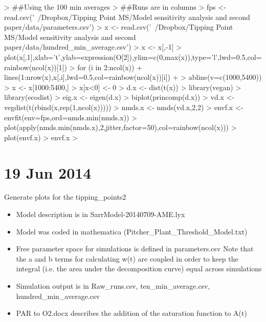 \documentclass[12pt]{article}
\begin{document}
\begin{Schunk}
\begin{Sinput}
> ##Using the 100 min averages
> ##Runs are in columns
>   fps <- read.csv('~/Dropbox/Tipping Point MS/Model sensitivity analysis and second paper/data/parameters.csv') 
> x <- read.csv('~/Dropbox/Tipping Point MS/Model sensitivity analysis and second paper/data/hundred_min_average.csv')
> x <- x[,-1]
> plot(x[,1],xlab='t',ylab=expression(O[2]),ylim=c(0,max(x)),type='l',lwd=0.5,col=rainbow(ncol(x))[1])
> for (i in 2:ncol(x)){
+   lines(1:nrow(x),x[,i],lwd=0.5,col=rainbow(ncol(x))[i])
+ }
> abline(v=c(1000,5400))
> x <- x[1000:5400,]
> x[x<0] <- 0
> d.x <- dist(t(x))
> library(vegan)
> library(ecodist)
> eig.x <- eigen(d.x)
> biplot(princomp(d.x))
> vd.x <- vegdist(t(rbind(x,rep(1,ncol(x)))))
> nmds.x <- nmds(vd.x,2,2)
> envf.x <- envfit(env=fps,ord=nmds.min(nmds.x))
> plot(apply(nmds.min(nmds.x),2,jitter,factor=50),col=rainbow(ncol(x)))
> plot(envf.x)
> envf.x
> 
\end{Sinput}
\end{Schunk}

\section{19 Jun 2014}

Generate plots for the tipping_points2

\begin{itemize}
\item Model description is in SarrModel-20140709-AME.lyx
\item Model was coded in mathematica (Pitcher_Plant_Threshold_Model.txt)
\item Free parameter space for simulations is defined in parameters.csv
  \subitem Note that the a and b terms for calculating w(t) are
  coupled in order to keep the integral (i.e. the area under the
  decomposition curve) equal across simulations
\item Simulation output is in Raw_runs.csv, ten_min_average.csv, hundred_min_average.csv
\item PAR to O2.docx describes the addition of the saturation function
  to A(t)
\end{itemize}
\end{document}
